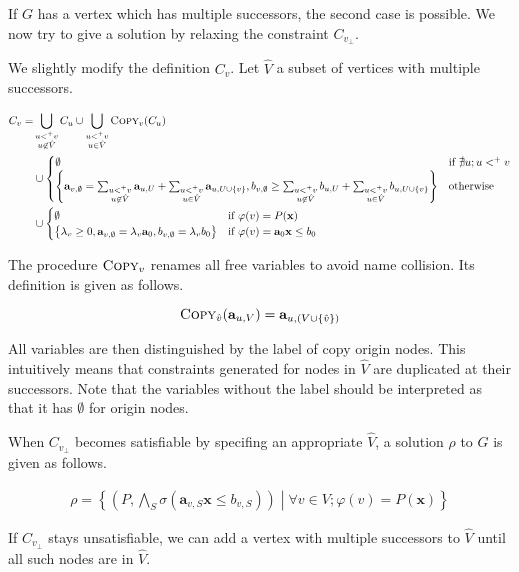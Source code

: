 \documentclass[a4paper,12pt]{article}
\begin{document}
If $G$ has a vertex which has multiple successors, the second case is
possible. We now try to give a solution by relaxing the constraint
$C_{v_\bot}$.

We slightly modify the definition $C_v$. Let $\hat V$ a subset of
vertices with multiple successors.

\begin{align*}
C_v = & \bigcup_{\substack{u <^+ v \\ u \not\in \hat V}} C_u \cup
\bigcup_{\substack{u <^+ v \\ u \in \hat V}} \textsc{Copy}_v (C_u)
\\
& \cup \begin{cases}
\emptyset
& \mbox{if } \nexists u; u <^+ v \\
\left\lbrace
 \mathbf{a}_{v,\emptyset} =
  \sum_{\substack{u <^+ v \\ u \not\in \hat V}} \mathbf{a}_{u,U} +
  \sum_{\substack{u <^+ v \\ u \in \hat V}} \mathbf{a}_{u,U \cup \left\lbrace v \right\rbrace},
 b_{v,\emptyset} \geq
  \sum_{\substack{u <^+ v \\ u \not\in \hat V}} b_{u,U} +
  \sum_{\substack{u <^+ v \\ u \in \hat V}} b_{u,U \cup \left\lbrace v \right\rbrace}
\right\rbrace
& \mbox{otherwise}
\end{cases}
\\
& \cup \begin{cases}
\emptyset
& \mbox{if } \varphi(v) = P(\mathbf{x}) \\
\left\lbrace
 \lambda_v \geq 0, \mathbf{a}_{v,\emptyset} = \lambda_v \mathbf{a}_0,
 b_{v,\emptyset} = \lambda_v b_0
\right\rbrace
& \mbox{if } \varphi(v) = \mathbf{a}_0 \mathbf{x} \leq b_0
\end{cases}
\end{align*}

The procedure $\textsc{Copy}_v$ renames all free variables to avoid
name collision. Its definition is given as follows.

\[\textsc{Copy}_{\hat v}(\mathbf{a}_{u,V}) = \mathbf{a}_{u,(V \cup
  \left\lbrace \hat v \right\rbrace)} \]

All variables are then distinguished by the label of copy origin
nodes. This intuitively means that constraints generated for nodes in
$\hat V$ are duplicated at their successors. Note that the variables
without the label should be interpreted as that it has $\emptyset$ for
origin nodes.

When $C_{v_\bot}$ becomes satisfiable by specifing an appropriate
$\hat V$, a solution $\rho$ to $G$ is given as follows.

\begin{align*}
 \rho = \left\lbrace
  \left( P, \bigwedge_S \sigma(\mathbf{a}_{v,S} \mathbf{x} \leq b_{v,S}) \right) \middle|
  \forall v \in V; \varphi(v) = P(\mathbf{x})
 \right\rbrace
\end{align*}

If $C_{v_\bot}$ stays unsatisfiable, we can add a vertex with multiple
successors to $\hat V$ until all such nodes are in $\hat V$.
\end{document}

